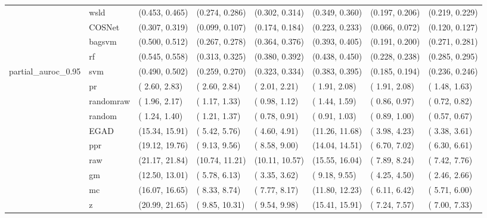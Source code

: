 \begin{table}[H]
{\begin{tabular}{llllllll}
 & wsld & (0.453, 0.465) & (0.274, 0.286) & (0.302, 0.314) & (0.349, 0.360) & (0.197, 0.206) & (0.219, 0.229)\\

 & COSNet & (0.307, 0.319) & (0.099, 0.107) & (0.174, 0.184) & (0.223, 0.233) & (0.066, 0.072) & (0.120, 0.127)\\

 & bagsvm & (0.500, 0.512) & (0.267, 0.278) & (0.364, 0.376) & (0.393, 0.405) & (0.191, 0.200) & (0.271, 0.281)\\

 & rf & (0.545, 0.558) & (0.313, 0.325) & (0.380, 0.392) & (0.438, 0.450) & (0.228, 0.238) & (0.285, 0.295)\\

\multirow{-15}{*}{\raggedright\arraybackslash partial\_auroc\_0.95} & svm & (0.490, 0.502) & (0.259, 0.270) & (0.323, 0.334) & (0.383, 0.395) & (0.185, 0.194) & (0.236, 0.246)\\
\cmidrule{1-8}
 & pr & ( 2.60,  2.83) & ( 2.60,  2.84) & ( 2.01,  2.21) & ( 1.91,  2.08) & ( 1.91,  2.08) & ( 1.48,  1.63)\\

 & randomraw & ( 1.96,  2.17) & ( 1.17,  1.33) & ( 0.98,  1.12) & ( 1.44,  1.59) & ( 0.86,  0.97) & ( 0.72,  0.82)\\

 & random & ( 1.24,  1.40) & ( 1.21,  1.37) & ( 0.78,  0.91) & ( 0.91,  1.03) & ( 0.89,  1.00) & ( 0.57,  0.67)\\

 & EGAD & (15.34, 15.91) & ( 5.42,  5.76) & ( 4.60,  4.91) & (11.26, 11.68) & ( 3.98,  4.23) & ( 3.38,  3.61)\\

 & ppr & (19.12, 19.76) & ( 9.13,  9.56) & ( 8.58,  9.00) & (14.04, 14.51) & ( 6.70,  7.02) & ( 6.30,  6.61)\\

 & raw & (21.17, 21.84) & (10.74, 11.21) & (10.11, 10.57) & (15.55, 16.04) & ( 7.89,  8.24) & ( 7.42,  7.76)\\

 & gm & (12.50, 13.01) & ( 5.78,  6.13) & ( 3.35,  3.62) & ( 9.18,  9.55) & ( 4.25,  4.50) & ( 2.46,  2.66)\\

 & mc & (16.07, 16.65) & ( 8.33,  8.74) & ( 7.77,  8.17) & (11.80, 12.23) & ( 6.11,  6.42) & ( 5.71,  6.00)\\

 & z & (20.99, 21.65) & ( 9.85, 10.31) & ( 9.54,  9.98) & (15.41, 15.91) & ( 7.24,  7.57) & ( 7.00,  7.33)\\


\end{tabular}}
\end{table}
